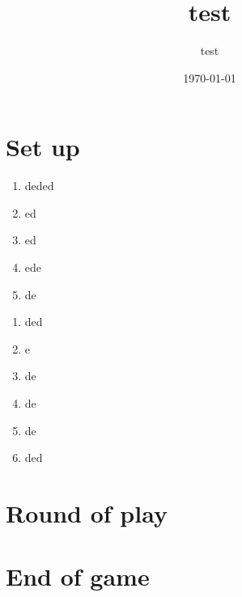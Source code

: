 \documentclass{article}%
\title{test}%
\author{test}%
\date{\today}%
\begin{document}
%
\pagestyle{empty}%
\normalsize%
\maketitle%
\section{ Set up
}%
\label{sec:Setup}%
\begin{enumerate}%
\item%
%
 deded
%
\item%
%
 ed
%
\item%
%
 ed
%
\item%
%
 ede
%
\item%
%
 de
%
\end{enumerate}%
\begin{enumerate}%
\item%
%
 ded
%
\item%
%
 e
%
\item%
%
 de
%
\item%
%
 de
%
\item%
%
 de
%
\item%
%
 ded
%
\end{enumerate}

%
\section{ Round of play
}%
\label{sec:Roundofplay}%

%
\section{ End of game}%
\label{sec:Endofgame}%

%
\end{document}

